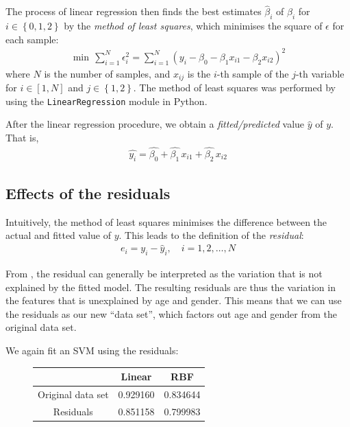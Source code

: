 \documentclass[12pt, twoside, a4paper]{report}
\begin{document}
The process of linear regression then finds the best estimates $\widehat{\beta}_i$ of $\beta_i$ for $i \in \left\lbrace 0,1,2 \right\rbrace$ by the \textit{method of least squares}, which minimises the square of $\epsilon$ for each sample:
\begin{align*}
\min \, \sum_{i=1}^N \epsilon_i^2 = \sum_{i=1}^N \left( y_i - \beta_0 - \beta_1x_{i1} - \beta_2x_{i2} \right)^2
\end{align*}
where $N$ is the number of samples, and $x_{ij}$ is the $i$-th sample of the $j$-th variable for $i \in [1,N]$ and $j \in \left\lbrace 1,2 \right\rbrace$. The method of least squares was performed by using the \texttt{LinearRegression} module in Python.

After the linear regression procedure, we obtain a \textit{fitted/predicted} value $\widehat{y}$ of $y$. That is,
\begin{align*}
\widehat{y_i} = \widehat{\beta_0} + \widehat{\beta_1} \, x_{i1} + \widehat{\beta_2} \, x_{i2}
\end{align*}

\subsection{Effects of the residuals}

Intuitively, the method of least squares minimises the difference between the actual and fitted value of $y$. This leads to the definition of the \textit{residual}:
\begin{align*}
e_i = y_i - \widehat{y}_i, \quad i=1,2,\dots,N
\end{align*}

From \cite{RefWorks:252}, the residual can generally be interpreted as the variation that is not explained by the fitted model. The resulting residuals are thus the variation in the features that is unexplained by age and gender. This means that we can use the residuals as our new ``data set'', which factors out age and gender from the original data set.

We again fit an SVM using the residuals:

\begin{figure}[h]
\begin{center}
    \begin{tabular}{| c | c | c | } \hline
      & Linear & RBF \\ \hline
    Original data set & 0.929160 & 0.834644 \\ \hline
	Residuals & 0.851158  & 0.799983 \\ \hline
    \end{tabular}
\end{center}
\end{figure}
\end{document}
